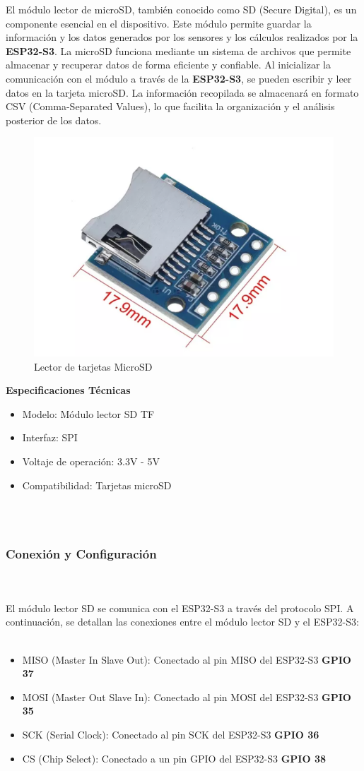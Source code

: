El módulo lector de microSD, también conocido como SD (Secure Digital), es un componente esencial en el dispositivo. Este módulo permite guardar la información y los datos generados por los sensores y los cálculos realizados por la \textbf{ESP32-S3}. La microSD funciona mediante un sistema de archivos que permite almacenar y recuperar datos de forma eficiente y confiable. Al inicializar la comunicación con el módulo a través de la \textbf{ESP32-S3}, se pueden escribir y leer datos en la tarjeta microSD. La información recopilada se almacenará en formato CSV (Comma-Separated Values), lo que facilita la organización y el análisis posterior de los datos.
\begin{figure}[H]
    \centering
    \includegraphics[width=2 in]{Imagenes/Metodologia/SD.png}
    \caption{Lector de tarjetas MicroSD}
    \label{fig:microSD}
\end{figure}
\textbf{Especificaciones Técnicas}
\begin{itemize}
    \item Modelo: Módulo lector SD TF
    \item Interfaz: SPI
    \item Voltaje de operación: 3.3V - 5V
    \item  Compatibilidad: Tarjetas microSD
\end{itemize} \\ \\
\subsubsection{Conexión y Configuración} \\\\

El módulo lector SD se comunica con el ESP32-S3 a través del protocolo SPI. A continuación, se detallan las conexiones entre el módulo lector SD y el ESP32-S3: \\ \\

\begin{itemize}
    \item MISO (Master In Slave Out): Conectado al pin MISO del ESP32-S3   \textbf{GPIO 37}
    \item MOSI (Master Out Slave In): Conectado al pin MOSI del ESP32-S3  \textbf{GPIO 35}
    \item SCK (Serial Clock): Conectado al pin SCK del ESP32-S3        \textbf{GPIO 36}
    \item CS (Chip Select): Conectado a un pin GPIO del ESP32-S3       \textbf{GPIO 38}
\end{itemize} \\ \\





